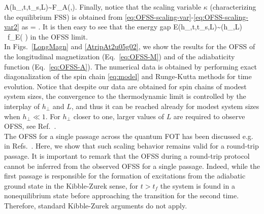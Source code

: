 \be\label{eq:OFSS-A}
A(h_\perp,t,t_s,L)\sim {\cal F}_A(\tau,\upsilon).
\ee
Finally, notice that the scaling variable $\kappa$ (characterizing the equilibrium FSS) is obtained from \eqref{eq:OFSS-scaling-var}-\eqref{eq:OFSS-scaling-var2} as
\be\label{eq:kappa-ofss}
\kappa = {\frac{2\tau}{\sqrt{\upsilon}}}.
\ee
It is then easy to see that the energy gap 
\be
\Delta E(h_\perp,t,t_s,L)\sim \Delta(h_\perp,L) \ f_E\left( {\frac{2\tau}{\sqrt{\upsilon}}}\right)
\ee
 in the OFSS limit.\\

In Figs.~\ref{LongMagn} and \ref{AtripAt2u05g02}, we show the results for the OFSS of the longitudinal magnetization (Eq.~\eqref{eq:OFSS-M}) and of the adiabaticity function (Eq.~\eqref{eq:OFSS-A}). The numerical data is obtained by performing exact diagonalization of the spin chain \eqref{eq:model} and Runge-Kutta methods for time evolution. Notice that despite our data are obtained for spin chains of modest system sizes, the convergence to the thermodynamic limit is controlled by the interplay of $h_\perp$ and $L$, and thus it can be reached already for modest system sizes when $h_\perp\ll 1$. For $h_\perp$ closer to one, larger values of $L$ are required to observe OFSS, see Ref.~\cite{campostrini2014finite,campostrini2015finite}.\\



The OFSS for a single passage across the quantum FOT has been discussed e.g. in Refs.~\cite{pelissetto2018out,sinha2021nonadiabatic,coulamy2017dynamics,shimizu2018dynamics,qiu2020observation,rossini2020dynamic}. Here, we show that such scaling behavior remains valid for a round-trip passage. It is important to remark that the OFSS during a round-trip protocol cannot be inferred from the observed OFSS for a single passage. Indeed,  while the first passage is responsible for the formation of excitations from the adiabatic ground state in the Kibble-Zurek sense, for $t>t_f$ the system is found in a nonequilibrium state before approaching the transition for the second time. Therefore, standard Kibble-Zurek arguments do not apply.\\

